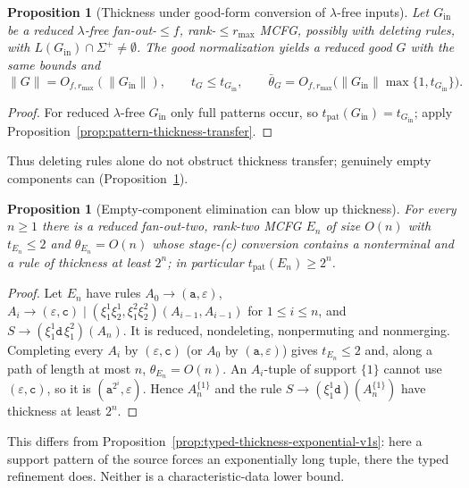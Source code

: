 \documentclass[11pt]{article}
\numberwithin{equation}{section}
\theoremstyle{plain}
\newtheorem{proposition}[theorem]{Proposition}
\theoremstyle{definition}
\theoremstyle{remark}
\newcommand{\eps}{\varepsilon}
\theoremstyle{plain}
\begin{document}
\begin{proposition}[Thickness under good-form conversion of $\lambda$-free inputs]
\label{prop:structural-good-thickness}
Let $G_{\mathrm{in}}$ be a reduced $\lambda$-free fan-out-$\le f$, rank-$\le r_{\max}$
MCFG, possibly with deleting rules, with $L(G_{\mathrm{in}})\cap\Sigma^+\ne\emptyset$.
The good normalization yields a reduced good $G$ with the same bounds and
\[
  \|G\|=O_{f,r_{\max}}(\|G_{\mathrm{in}}\|),\qquad
  t_G\le t_{G_{\mathrm{in}}},\qquad
  \bar\theta_G=O_{f,r_{\max}}\bigl(\|G_{\mathrm{in}}\|\max\{1,t_{G_{\mathrm{in}}}\}\bigr).
\]
\end{proposition}

\begin{proof}
For reduced $\lambda$-free $G_{\mathrm{in}}$ only full patterns occur, so
$t_{\mathrm{pat}}(G_{\mathrm{in}})=t_{G_{\mathrm{in}}}$; apply
Proposition~\ref{prop:pattern-thickness-transfer}.
\end{proof}

Thus deleting rules alone do not obstruct thickness transfer; genuinely empty
components can (Proposition~\ref{prop:empty-component-blowup}).


\begin{proposition}[Empty-component elimination can blow up thickness]
\label{prop:empty-component-blowup}
For every $n\ge1$ there is a reduced fan-out-two, rank-two MCFG $E_n$ of size $O(n)$
with $t_{E_n}\le2$ and $\theta_{E_n}=O(n)$ whose stage-(c) conversion contains a
nonterminal and a rule of thickness at least $2^n$; in particular
$t_{\mathrm{pat}}(E_n)\ge2^n$.
\end{proposition}

\begin{proof}
Let $E_n$ have rules
$A_0\to(\mathtt a,\eps)$, $A_i\to(\eps,\mathtt c)\mid(\xi_1^1\xi_2^1,\xi_1^2\xi_2^2)
(A_{i-1},A_{i-1})$ for $1\le i\le n$, and $S\to(\xi_1^1\mathtt d\,\xi_1^2)(A_n)$.  It is
reduced, nondeleting, nonpermuting and nonmerging.  Completing every $A_i$ by
$(\eps,\mathtt c)$ (or $A_0$ by $(\mathtt a,\eps)$) gives $t_{E_n}\le2$ and, along a
path of length at most $n$, $\theta_{E_n}=O(n)$.  An $A_i$-tuple of support $\{1\}$
cannot use $(\eps,\mathtt c)$, so it is $(\mathtt a^{2^i},\eps)$.  Hence $A_n^{\{1\}}$ and
the rule $S\to(\xi_1^1\mathtt d)(A_n^{\{1\}})$ have thickness at least $2^n$.
\end{proof}

This differs from Proposition~\ref{prop:typed-thickness-exponential-v1s}: here a support
pattern of the source forces an exponentially long tuple, there the typed refinement
does.  Neither is a characteristic-data lower bound.
\end{document}
